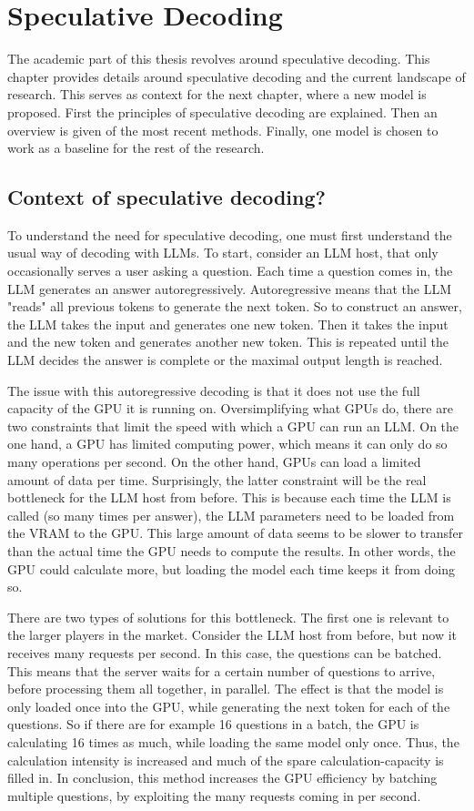 
\chapter{Speculative Decoding}

The academic part of this thesis revolves around speculative decoding. This chapter provides details around speculative decoding and the current landscape of research. This serves as context for the next chapter, where a new model is proposed. First the principles of speculative decoding are explained. Then an overview is given of the most recent methods. Finally, one model is chosen to work as a baseline for the rest of the research.

\section{Context of speculative decoding?}
To understand the need for speculative decoding, one must first understand the usual way of decoding with LLMs. To start, consider an LLM host, that only occasionally serves a user asking a question. Each time a question comes in, the LLM generates an answer autoregressively. Autoregressive means that the LLM "reads" all previous tokens to generate the next token. So to construct an answer, the LLM takes the input and generates one new token. Then it takes the input and the new token and generates another new token. This is repeated until the LLM decides the answer is complete or the maximal output length is reached.

The issue with this autoregressive decoding is that it does not use the full capacity of the GPU it is running on. Oversimplifying what GPUs do, there are two constraints that limit the speed with which a GPU can run an LLM. On the one hand, a GPU has limited computing power, which means it can only do so many operations per second. On the other hand, GPUs can load a limited amount of data per time. Surprisingly, the latter constraint will be the real bottleneck for the LLM host from before. This is because each time the LLM is called (so many times per answer), the LLM parameters need to be loaded from the VRAM to the GPU. This large amount of data seems to be slower to transfer than the actual time the GPU needs to compute the results. In other words, the GPU could calculate more, but loading the model each time keeps it from doing so.

There are two types of solutions for this bottleneck. The first one is relevant to the larger players in the market. Consider the LLM host from before, but now it receives many requests per second. In this case, the questions can be batched. This means that the server waits for a certain number of questions to arrive, before processing them all together, in parallel. The effect is that the model is only loaded once into the GPU, while generating the next token for each of the questions. So if there are for example 16 questions in a batch, the GPU is calculating 16 times as much, while loading the same model only once. Thus, the calculation intensity is increased and much of the spare calculation-capacity is filled in. In conclusion, this method increases the GPU efficiency by batching multiple questions, by exploiting the many requests coming in per second.

